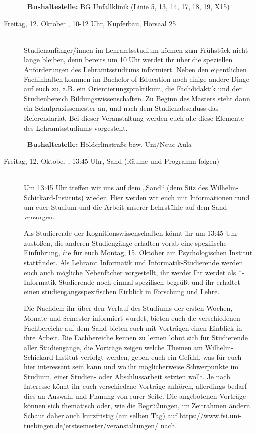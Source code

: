 \begin{description}
~\textbf{Bushaltestelle:} BG Unfallklinik (Linie 5, 13, 14, 17, 18, 19, X15)

\iflehramt
\item[Freitag, 12. Oktober \YEAR, 10-12 Uhr, Kupferbau, Hörsaal 25]\ \\
Studienanfänger/innen im Lehramtsstudium können zum Frühstück nicht lange bleiben, denn bereits um 10 Uhr werdet ihr über die speziellen
Anforderungen des Lehramtsstudiums informiert. Neben den eigentlichen Fachinhalten kommen im
Bachelor of Education noch einige andere Dinge auf euch zu, z.B. ein Orientierungspraktikum, die
Fachdidaktik und der Studienbereich Bildungswissenschaften. Zu Beginn des Masters steht dann
ein Schulpraxissemester an, und nach dem Studienabschluss das Referendariat. Bei dieser Veranstaltung werden euch
alle diese Elemente des Lehramtsstudiums vorgestellt.

~\textbf{Bushaltestelle:} Hölderlinstraße bzw. Uni/Neue Aula
\fi

\item[Freitag, 12. Oktober \YEAR, 13{\ifkogwiss}:45{\fi} Uhr, Sand (Räume und Programm folgen)]\ \\
Um 13{\ifkogwiss}:45{\fi} Uhr treffen wir uns auf dem „Sand“ (dem Sitz des Wilhelm-Schickard-Instituts)
wieder. Hier werden wir euch mit Informationen rund um{\ifkogwiss} {\else} euer Studium und {\fi}die Arbeit unserer Lehrstühle auf dem Sand versorgen.

{\ifkogwiss}Als Studierende der Kognitionswissenschaften könnt ihr um 13:45 Uhr zusto{\ss}en, die anderen Studiengänge erhalten vorab eine spezifische Einführung, die für euch Montag, 15. Oktober am Psychologischen Institut stattfindet. {\else}{\ifinfo}Als Lehramt Informatik und Informatik-Studierende werden euch auch mögliche Nebenfächer vorgestellt, ihr werdet {\else}Ihr werdet als *-Informatik-Studierende {\fi}noch einmal spezifisch begrüßt und ihr erhaltet einen studiengangsspezifischen Einblick in Forschung und Lehre.{\fi}

{\ifkogwiss}Die {\else}Nachdem ihr über den Verlauf des Studiums der ersten Wochen, Monate und Semester informiert wurdet, bieten euch die {\fi}verschiedenen Fachbereiche {\ifkogwiss}auf dem Sand bieten euch {\else} {\fi}mit Vorträgen einen Einblick in ihre Arbeit. Die Fachbereiche kennen zu lernen lohnt sich für Studierende aller Studiengänge, die Vorträge zeigen welche Themen am Wilhelm-Schickard-Institut verfolgt werden, geben euch ein Gefühl, was für euch hier interessant sein kann und wo ihr möglicherweise Schwerpunkte im Studium, einer Studien- oder Abschlussarbeit setzten wollt. Je nach Interesse könnt ihr euch verschiedene Vorträge anhören, allerdings bedarf dies an Auswahl und Planung von eurer Seite. Die angebotenen Vorträge können sich thematisch oder, wie die Begrüßungen, im Zeitrahmen ändern. Schaut daher auch kurzfristig (am selben Tag) auf \url{https://www.fsi.uni-tuebingen.de/erstsemester/veranstaltungen/} nach.


\end{description}
